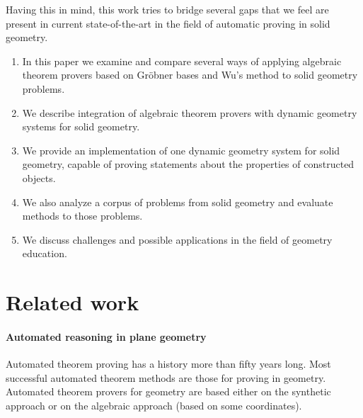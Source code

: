 \documentclass[final,1p,times,authoryear]{elsarticle}
\begin{document}
Having this in mind, this work tries to bridge several gaps that we
feel are present in current state-of-the-art in the field of automatic
proving in solid geometry.
\begin{enumerate}
\item In this paper we examine and compare several ways of applying
  algebraic theorem provers based on Gr\"obner bases and Wu's method
  to solid geometry problems.

\item We describe integration of algebraic theorem provers with
  dynamic geometry systems for solid geometry.

\item We provide an implementation of one dynamic geometry system for
  solid geometry, capable of proving statements about the properties
  of constructed objects.

\item We also analyze a corpus of problems from solid geometry and
  evaluate methods to those problems.

\item We discuss challenges and possible applications in the field of
  geometry education.
\end{enumerate}


\section{Related work}
\paragraph{Automated reasoning in plane geometry}
Automated theorem proving has a history more than fifty years
long. Most successful automated theorem methods are those for proving
in geometry. Automated theorem provers for geometry are based either
on the synthetic approach or on the algebraic approach (based on some
coordinates).
\end{document}
